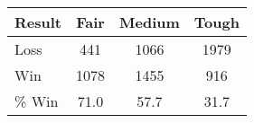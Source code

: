 \begin{tabular}{l|ccc}
  \toprule
Result & Fair & Medium & Tough \\ \midrule
Loss & 441 & 1066 & 1979 \\ 
Win & 1078 & 1455 & 916 \\ \midrule
\% Win & 71.0 & 57.7 & 31.7 \\ \bottomrule
\end{tabular}
